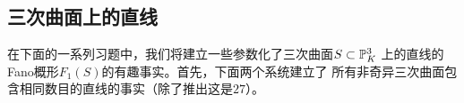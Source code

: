 \subsection{三次曲面上的直线}

在下面的一系列习题中，我们将建立一些参数化了三次曲面$S\subset \P_K^3$
上的直线的Fano概形$F_1(S)$的有趣事实。首先，下面两个系统建立了
所有非奇异三次曲面包含相同数目的直线的事实（除了推出这是$27$）。



